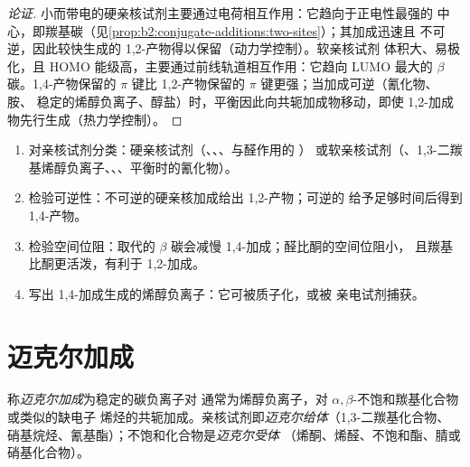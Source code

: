 \begin{proof}[论证]
小而带电的硬亲核试剂主要通过电荷相互作用：它趋向于正电性最强的
中心，即羰基碳（见\cref{prop:b2:conjugate-additions:two-sites}）；其加成迅速且
不可逆，因此较快生成的 1,2-产物得以保留（动力学控制）。软亲核试剂
体积大、易极化，且 HOMO 能级高，主要通过前线轨道相互作用：它趋向
LUMO 最大的 $\beta$ 碳。1,4-产物保留的  $\pi$ 键比
1,2-产物保留的  $\pi$ 键更强；当加成可逆（氰化物、胺、
稳定的烯醇负离子、醇盐）时，平衡因此向共轭加成物移动，即使
1,2-加成物先行生成（热力学控制）。
\end{proof}

\begin{method}[预测加成方式]\label{met:b2:conjugate-additions:predict-mode}
\begin{enumerate}
  \item 对亲核试剂分类：硬亲核试剂（、、、与醛作用的 ）
        或软亲核试剂（、1,3-二羰基烯醇负离子、、、平衡时的氰化物）。
  \item 检验可逆性：不可逆的硬亲核加成给出 1,2-产物；可逆的
        给予足够时间后得到 1,4-产物。
  \item 检验空间位阻：取代的 $\beta$ 碳会减慢 1,4-加成；醛比酮的空间位阻小，
        且羰基比酮更活泼，有利于 1,2-加成。
  \item 写出 1,4-加成生成的烯醇负离子：它可被质子化，或被
        亲电试剂捕获。
\end{enumerate}
\end{method}

\section{迈克尔加成}

\begin{definition}[迈克尔加成]\label{def:b2:conjugate-additions:michael}
称\emph{迈克尔加成}为稳定的碳负离子对
通常为烯醇负离子，对 $\alpha,\beta$-不饱和羰基化合物或类似的缺电子
烯烃的共轭加成。亲核试剂即\emph{迈克尔给体}（1,3-二羰基化合物、
硝基烷烃、氰基酯）；不饱和化合物是\emph{迈克尔受体}
（烯酮、烯醛、不饱和酯、腈或硝基化合物）。
\end{definition}

